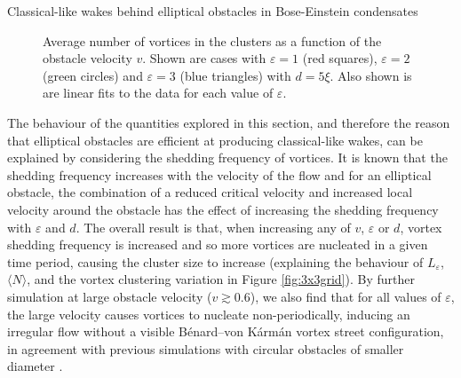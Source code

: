 \begin{chapter}{\label{cha:wake}Classical-like wakes behind elliptical obstacles in Bose-Einstein condensates}
\begin{figure}
\centering
{}
\caption{\label{fig:Svslocal2} Average number of vortices in the clusters as a function of the obstacle velocity $v$.  Shown are cases with $\varepsilon=1$ (red squares),  $\varepsilon=2$ (green circles) and $\varepsilon=3$ (blue triangles) with $d=5\xi$. Also shown is are linear fits to the data for each value of $\varepsilon$.}
\end{figure}

The behaviour of the quantities explored in this section, and therefore the reason that elliptical obstacles are efficient at producing classical-like wakes, can be explained by considering the shedding frequency of vortices. It is known that the shedding frequency increases with the velocity of the flow \cite{jma99} and for an elliptical obstacle, the combination of a reduced critical velocity and increased local velocity around the obstacle has the effect of increasing the shedding frequency with $\varepsilon$ and $d$. The overall result is that, when increasing any of $v$, $\varepsilon$ or $d$, vortex shedding frequency is increased and so more vortices are nucleated in a given time period, causing the cluster size to increase (explaining the behaviour of $L_\varepsilon$, $\langle N\rangle$, and the vortex clustering variation in Figure \ref{fig:3x3grid}). By further simulation at large obstacle velocity ($v\gtrsim0.6$), we also find that for all values of $\varepsilon$, the large velocity causes vortices to nucleate non-periodically, inducing an irregular flow without a visible B\'enard--von K\'arm\'an vortex street configuration, in agreement with previous simulations with circular obstacles of smaller diameter \cite{saito10}.


\end{chapter}
